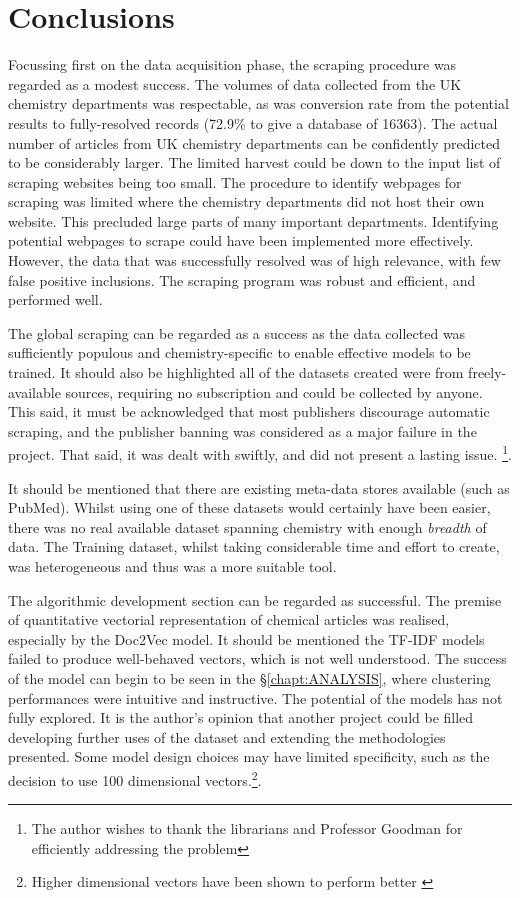 \chapter{Conclusions}
Focussing first on the data acquisition phase, the scraping procedure was regarded as a modest success. The volumes of data collected from the UK chemistry departments was respectable, as was conversion rate from the potential results to fully-resolved records (72.9\%  to give a database of 16363). The actual number of articles from UK chemistry departments can be confidently predicted to be considerably larger. The limited harvest could be down to the input list of scraping websites being too small. The procedure to identify webpages for scraping was limited where the chemistry departments did not host their own website. This  precluded large parts of many important departments. Identifying potential webpages to scrape could have been implemented more effectively.  However, the data that was successfully resolved was of high relevance, with few false positive inclusions. The scraping program was robust and efficient, and performed well. 

The global scraping can be regarded as a success as the data collected was sufficiently populous and chemistry-specific  to enable effective models to be trained. It should also be highlighted all of the datasets created were from freely-available sources, requiring no subscription and could be collected by anyone. This said, it must be acknowledged that most publishers discourage automatic scraping, and the publisher banning was considered as a major failure in the project. That said, it was dealt with swiftly, and did not present a lasting issue. \footnote{The author wishes to thank the librarians and Professor Goodman for efficiently addressing the problem}.

 It should be mentioned that there are existing meta-data stores available (such as PubMed). Whilst using one of these datasets would certainly have been easier, there was no real available dataset spanning chemistry with enough \emph{breadth} of data. The Training dataset, whilst taking considerable time and effort to create, was heterogeneous and thus was a more suitable tool.

The algorithmic development section can be regarded as successful. The premise of quantitative vectorial representation of chemical articles was realised, especially by the Doc2Vec model. It should be mentioned the TF-IDF models failed to produce well-behaved vectors, which is not well understood. The success of the model can begin to be seen in the \S\ref{chapt:ANALYSIS}, where clustering performances were intuitive and instructive. The potential of the models has not fully explored. It is the author's opinion that another project could be filled developing further uses of the dataset and extending the methodologies presented. 
Some model design choices may have limited specificity, such as the decision to use 100 dimensional vectors.\footnote{Higher dimensional vectors have been shown to perform better \cite{word2vec1}}.

